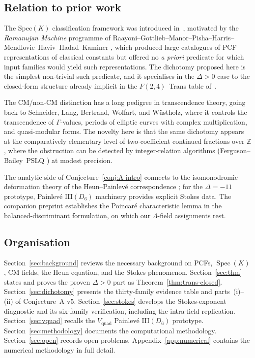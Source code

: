 \documentclass[11pt,reqno]{amsart}
\theoremstyle{definition}
\DeclareMathOperator{\Spec}{Spec}
\begin{document}
\subsection{Relation to prior work}\label{ssec:prior}

The Spec$(K)$ classification framework was introduced
in~\cite{Papanokechi2026Spec}, motivated by the
\emph{Ramanujan Machine} programme of
Raayoni--Gottlieb--Manor--Pisha--Harris--Mendlovic--Haviv--Hadad--Kaminer
\cite{Raayoni2021}, which produced large catalogues of
PCF representations of classical constants but offered no
\emph{a priori} predicate for which input families would yield
such representations. The dichotomy proposed here is the simplest
non-trivial such predicate, and it specialises in the $\Delta>0$
case to the closed-form structure already implicit in the
$F(2,4)$~Trans table of~\cite{Papanokechi2026F24}.

The CM/non-CM distinction has a long pedigree in transcendence
theory, going back to Schneider, Lang, Bertrand, Wolfart, and
W\"ustholz, where it controls the transcendence of
$\Gamma$-values, periods of elliptic curves with complex
multiplication, and quasi-modular forms. The novelty here is
that the same dichotomy appears at the comparatively elementary
level of two-coefficient continued fractions over $\mathbb{Z}$,
where the obstruction can be detected by integer-relation
algorithms (Ferguson--Bailey~PSLQ \cite{FergusonBailey1992}) at
modest precision.

The analytic side of Conjecture~\ref{conj:A-intro} connects to
the isomonodromic deformation theory of the Heun--Painlev\'e
correspondence \cite{Okamoto1987}; for the
$\Delta=-11$ prototype, Painlev\'e III$(D_{6})$ machinery
\cite{Papanokechi2026Vquad} provides explicit Stokes data.
The companion preprint
\cite{Papanokechi2026Spec} establishes the Poincar\'e
characteristic lemma in the balanced-discriminant
formulation, on which our $\Lambda$-field assignments rest.

\subsection{Organisation}\label{ssec:org}

Section~\ref{sec:background} reviews the necessary background
on PCFs, $\Spec(K)$, CM fields, the Heun equation, and the
Stokes phenomenon. Section~\ref{sec:thm} states and proves
the proven $\Delta>0$ part as Theorem~\ref{thm:trans-closed}.
Section~\ref{sec:dichotomy} presents the thirty-family
evidence table and parts~(i)--(ii) of Conjecture~A v5.
Section~\ref{sec:stokes} develops the Stokes-exponent
diagnostic and its six-family verification, including the
intra-field replication. Section~\ref{sec:vquad} recalls the
$V_{\mathrm{quad}}$ Painlev\'e III$(D_{6})$ prototype.
Section~\ref{sec:methodology} documents the computational
methodology. Section~\ref{sec:open} records open problems.
Appendix~\ref{app:numerical} contains the numerical methodology
in full detail.
\end{document}

